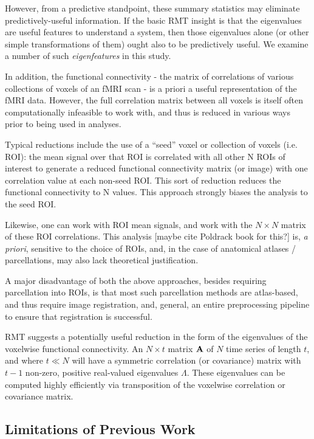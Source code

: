 \documentclass[12pt]{spieman}  %
\begin{document}
\begin{spacing}{2}
However, from a predictive standpoint, these summary statistics may eliminate
predictively-useful information. If the basic RMT insight is that the
eigenvalues are useful features to understand a system, then those eigenvalues
alone (or other simple transformations of them) ought also to be predictively
useful. We examine a number of such \textit{eigenfeatures} in this study.

In addition, the functional connectivity - the matrix of correlations of
various collections of voxels of an fMRI scan - is a priori a useful
representation of the fMRI data. However, the full correlation matrix between
all voxels is itself often computationally infeasible to work with, and thus is
reduced in various ways prior to being used in analyses.

Typical reductions include the use of a ``seed'' voxel or collection of voxels
(i.e. ROI): the mean signal over that ROI is correlated with all other N ROIs
of interest to generate a reduced functional connectivity matrix (or image)
with one correlation value at each non-seed ROI. This sort of reduction reduces
the functional connectivity to N values. This approach strongly biases the
analysis to the seed ROI.

Likewise, one can work with ROI mean signals, and work with the \(N \times N\)
matrix of these ROI correlations. This analysis [maybe cite Poldrack book for
this?] is, \textit{a priori}, sensitive to the choice of ROIs, and, in the case
of anatomical atlases / parcellations, may also lack theoretical justification.

A major disadvantage of both the above approaches, besides requiring
parcellation into ROIs, is that most such parcellation methods are atlas-based,
and thus require image registration, and, general, an entire preprocessing
pipeline to ensure that registration is successful.

RMT suggests a potentially useful reduction in the form of the eigenvalues of
the voxelwise functional connectivity. An \(N \times t\) matrix \(\bf{A}\) of
\(N\) time series of length \(t\), and where \(t \ll N\) will have a symmetric
correlation (or covariance) matrix with \(t - 1\) non-zero, positive
real-valued eigenvalues \(\Lambda\). These eigenvalues can be computed highly
efficiently via transposition of the voxelwise correlation or covariance
matrix.


\subsection{Limitations of Previous Work}


\end{spacing}
\end{document}
